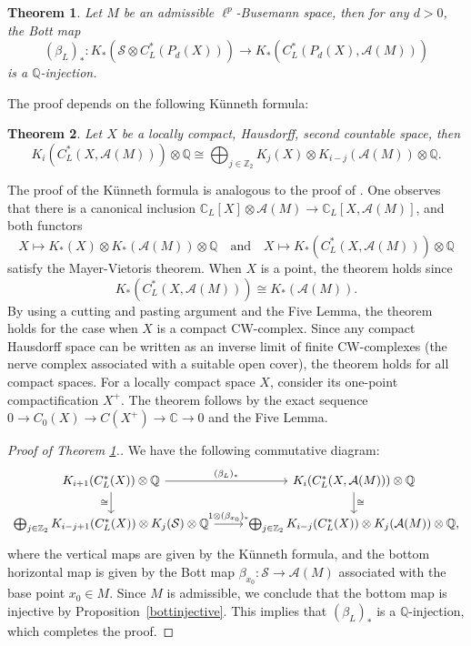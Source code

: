 \documentclass{article}
\theoremstyle{plain}
\newtheorem{theorem}{Theorem}[section]
\theoremstyle{definition}
\theoremstyle{remark}
\def\A{\mathcal A}
\def\IC{\mathbb C}
\def\S{\mathcal S}
\begin{document}
	\begin{theorem}\label{BLinjective}
		Let $M$ be an admissible $\ell^p$-Busemann space, then for any $d> 0$, the Bott map
		$$(\beta_L)_*:K_*(\S\otimes C^*_{L}(P_d(X)))\to K_*(C^*_{L}(P_d(X),\A(M)))$$
		is a $\mathbb{Q}$-injection.
	\end{theorem}
	The proof depends on the following Künneth formula:
	\begin{theorem}\label{kunneth}
		Let $X$ be a locally compact, Hausdorff, second countable space, then
		$$K_i(C^*_L(X,\A(M)))\otimes\mathbb{Q}\cong \bigoplus_{j\in\mathbb{Z}_2}K_j(X)\otimes K_{i-j}(\A(M))\otimes\mathbb{Q}.$$
	\end{theorem}
	The proof of the Künneth formula is analogous to the proof of \cite[Theorem~A.10]{guo2024hilbert}. One observes that there is a canonical inclusion $\IC_L[X]\otimes\A(M)\to\IC_L[X,\A(M)]$, and both functors
	$$X\mapsto K_*(X)\otimes K_*(\A(M))\otimes\mathbb{Q}\quad\text{and}\quad X\mapsto K_*(C^*_L(X,\A(M)))\otimes\mathbb{Q}$$
	satisfy the Mayer-Vietoris theorem. When $X$ is a point, the theorem holds since 
	$$K_*(C^*_L(X,\A(M)))\cong K_*(\A(M)).$$ 
	By using a cutting and pasting argument and the Five Lemma, the theorem holds for the case when $X$ is a compact CW-complex. Since any compact Hausdorff space can be written as an inverse limit of finite CW-complexes (the nerve complex associated with a suitable open cover), the theorem holds for all compact spaces. For a locally compact space $X$, consider its one-point compactification $X^+$. The theorem follows by the exact sequence $0\to C_0(X)\to C(X^+)\to \IC\to 0$ and the Five Lemma.
	
	\begin{proof}[Proof of Theorem \ref{BLinjective}.]
		We have the following commutative diagram:
		\[\begin{tikzcd}
			K_{i+1}(C^*_L(X))\otimes\mathbb{Q} \arrow[r, "(\beta_L)_*"] \arrow[d, "\cong"'] & K_i(C^*_L(X ,\A(M)))\otimes\mathbb{Q}\arrow[d, "\cong"] \\
			\bigoplus_{j\in\mathbb{Z}_2}K_{i-j+1}(C^*_L(X))\otimes K_j(\S)\otimes\mathbb{Q}  \arrow[r, "1\otimes(\beta_{x_0})_*"] & \bigoplus_{j\in\mathbb{Z}_2}K_{i-j}(C^*_L(X))\otimes K_j(\A(M))\otimes\mathbb{Q},                
		\end{tikzcd}\]
		where the vertical maps are given by the Künneth formula, and the bottom horizontal map is given by the Bott map $\beta_{x_0}:\S\to\A(M)$ associated with the base point $x_0\in M$.
		Since $M$ is admissible, we conclude that the bottom map is injective by Proposition~\ref{bottinjective}. This implies that $(\beta_L)_*$ is a $\mathbb{Q}$-injection, which completes the proof.
	\end{proof}
	
\end{document}
